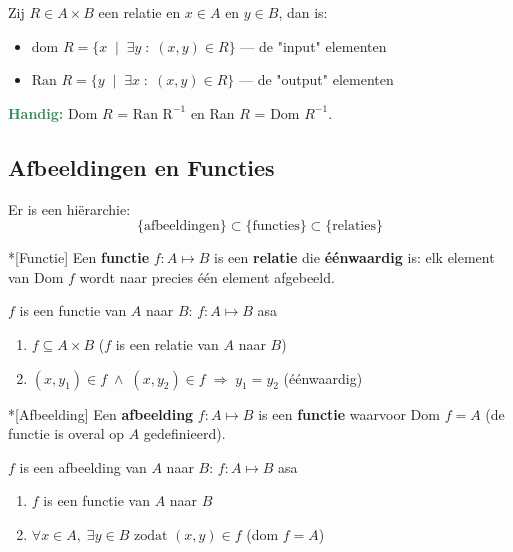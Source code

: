 
Zij $R \in A \times B$ een relatie en $x \in A$ en $y \in B$, dan is:
\begin{itemize}
    \item $\text{dom } R = \{x \; \mid \; \exists y \;:\; (x,y) \in R\}$ --- de "input" elementen
    \item $\text{Ran } R = \{y \;\mid\; \exists x \;:\; (x,y) \in R\}$ --- de "output" elementen
\end{itemize}

\begin{barbox}[SeaGreen][gray!5]
    \textcolor{SeaGreen}{\textbf{Handig:}} Dom $R$ = Ran $\text{R}^{-1}$ en Ran $R$ = Dom $R^{-1}$.
\end{barbox}

\newpage
\subsection{Afbeeldingen en Functies}

Er is een hiërarchie:
\begin{equation*}
    \{\text{afbeeldingen}\} \subset \{\text{functies}\} \subset \{\text{relaties}\}
\end{equation*}

\begin{nicedefinition}*[Functie]
    \nextpart[Functie.] 
    Een \textbf{functie} $f: A \mapsto B$ is een \textbf{relatie} die \textbf{éénwaardig} is: elk element van Dom $f$ wordt naar precies één element afgebeeld.

    \vspace{0.5cm}

    $f$ is een functie van $A$ naar $B$: $f: A \mapsto B$ asa
    \begin{enumerate}
        \item $f \subseteq A \times B$ ($f$ is een relatie van $A$ naar $B$)
        \item $(x, y_1) \in f \; \land \; (x, y_2) \in f \;\Longrightarrow \; y_1 = y_2$ (éénwaardig)
    \end{enumerate}
\end{nicedefinition}

\begin{nicedefinition}*[Afbeelding]
    \nextpart[Afbeelding.] 
    Een \textbf{afbeelding} $f:A\mapsto B$ is een \textbf{functie} waarvoor Dom $f=A$ (de functie is overal op $A$ gedefinieerd).

    \vspace{0.5cm}

    $f$ is een afbeelding van $A$ naar $B$: $f:A \mapsto B$ asa
    \begin{enumerate}
        \item $f$ is een functie van $A$ naar $B$
        \item $\forall x \in A, \; \exists y \in B \text{ zodat } (x,y) \in f$ (dom $f=A$)
    \end{enumerate}
\end{nicedefinition}

